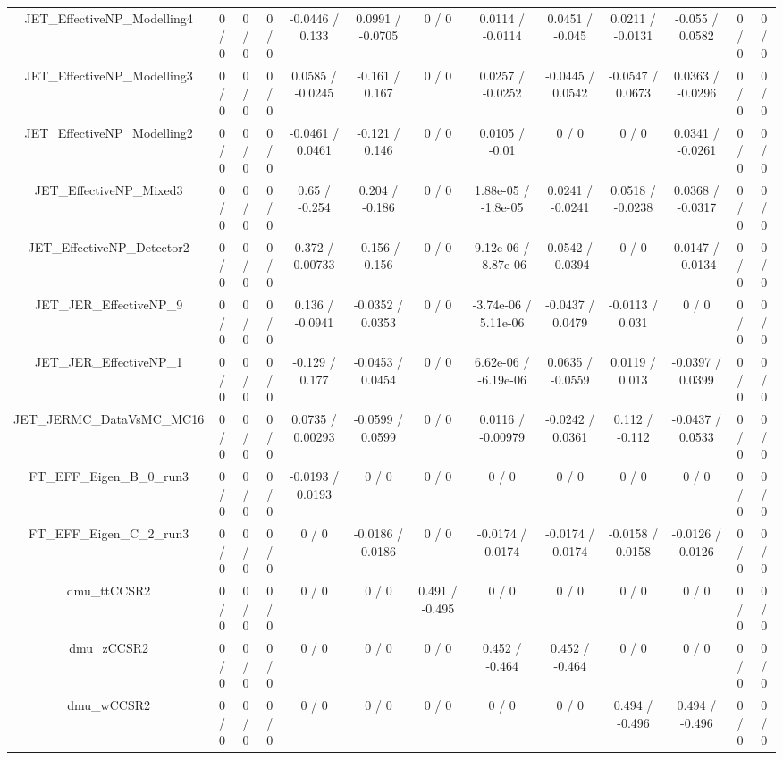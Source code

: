 \documentclass[10pt]{article}
\begin{document}
\begin{table}[htbp]
\begin{center}
\begin{tabular}{|c|c|c|c|c|c|c|c|c|c|c|c|c|}
  JET_EffectiveNP_Modelling4 & 0 / 0 & 0 / 0 & 0 / 0 & -0.0446 / 0.133 & 0.0991 / -0.0705 & 0 / 0 & 0.0114 / -0.0114 & 0.0451 / -0.045 & 0.0211 / -0.0131 & -0.055 / 0.0582 & 0 / 0 & 0 / 0 \\ 
  JET_EffectiveNP_Modelling3 & 0 / 0 & 0 / 0 & 0 / 0 & 0.0585 / -0.0245 & -0.161 / 0.167 & 0 / 0 & 0.0257 / -0.0252 & -0.0445 / 0.0542 & -0.0547 / 0.0673 & 0.0363 / -0.0296 & 0 / 0 & 0 / 0 \\ 
  JET_EffectiveNP_Modelling2 & 0 / 0 & 0 / 0 & 0 / 0 & -0.0461 / 0.0461 & -0.121 / 0.146 & 0 / 0 & 0.0105 / -0.01 & 0 / 0 & 0 / 0 & 0.0341 / -0.0261 & 0 / 0 & 0 / 0 \\ 
  JET_EffectiveNP_Mixed3 & 0 / 0 & 0 / 0 & 0 / 0 & 0.65 / -0.254 & 0.204 / -0.186 & 0 / 0 & 1.88e-05 / -1.8e-05 & 0.0241 / -0.0241 & 0.0518 / -0.0238 & 0.0368 / -0.0317 & 0 / 0 & 0 / 0 \\ 
  JET_EffectiveNP_Detector2 & 0 / 0 & 0 / 0 & 0 / 0 & 0.372 / 0.00733 & -0.156 / 0.156 & 0 / 0 & 9.12e-06 / -8.87e-06 & 0.0542 / -0.0394 & 0 / 0 & 0.0147 / -0.0134 & 0 / 0 & 0 / 0 \\ 
  JET_JER_EffectiveNP_9 & 0 / 0 & 0 / 0 & 0 / 0 & 0.136 / -0.0941 & -0.0352 / 0.0353 & 0 / 0 & -3.74e-06 / 5.11e-06 & -0.0437 / 0.0479 & -0.0113 / 0.031 & 0 / 0 & 0 / 0 & 0 / 0 \\ 
  JET_JER_EffectiveNP_1 & 0 / 0 & 0 / 0 & 0 / 0 & -0.129 / 0.177 & -0.0453 / 0.0454 & 0 / 0 & 6.62e-06 / -6.19e-06 & 0.0635 / -0.0559 & 0.0119 / 0.013 & -0.0397 / 0.0399 & 0 / 0 & 0 / 0 \\ 
  JET_JERMC_DataVsMC_MC16 & 0 / 0 & 0 / 0 & 0 / 0 & 0.0735 / 0.00293 & -0.0599 / 0.0599 & 0 / 0 & 0.0116 / -0.00979 & -0.0242 / 0.0361 & 0.112 / -0.112 & -0.0437 / 0.0533 & 0 / 0 & 0 / 0 \\ 
  FT_EFF_Eigen_B_0_run3 & 0 / 0 & 0 / 0 & 0 / 0 & -0.0193 / 0.0193 & 0 / 0 & 0 / 0 & 0 / 0 & 0 / 0 & 0 / 0 & 0 / 0 & 0 / 0 & 0 / 0 \\ 
  FT_EFF_Eigen_C_2_run3 & 0 / 0 & 0 / 0 & 0 / 0 & 0 / 0 & -0.0186 / 0.0186 & 0 / 0 & -0.0174 / 0.0174 & -0.0174 / 0.0174 & -0.0158 / 0.0158 & -0.0126 / 0.0126 & 0 / 0 & 0 / 0 \\ 
  dmu_ttCCSR2 & 0 / 0 & 0 / 0 & 0 / 0 & 0 / 0 & 0 / 0 & 0.491 / -0.495 & 0 / 0 & 0 / 0 & 0 / 0 & 0 / 0 & 0 / 0 & 0 / 0 \\ 
  dmu_zCCSR2 & 0 / 0 & 0 / 0 & 0 / 0 & 0 / 0 & 0 / 0 & 0 / 0 & 0.452 / -0.464 & 0.452 / -0.464 & 0 / 0 & 0 / 0 & 0 / 0 & 0 / 0 \\ 
  dmu_wCCSR2 & 0 / 0 & 0 / 0 & 0 / 0 & 0 / 0 & 0 / 0 & 0 / 0 & 0 / 0 & 0 / 0 & 0.494 / -0.496 & 0.494 / -0.496 & 0 / 0 & 0 / 0 \\ 

\end{tabular}
\end{center}
\end{table}
\end{document}
